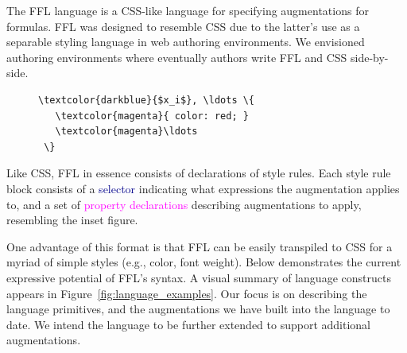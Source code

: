 The FFL language is a CSS-like language for specifying augmentations for formulas. FFL was designed to resemble CSS due to the latter's use as a separable styling language in web authoring environments. We envisioned authoring environments where eventually authors write FFL and CSS side-by-side.

\begin{figure}
\vspace{-2ex} %
\begin{Verbatim}[commandchars=\\\{\}]
 \textcolor{darkblue}{$x_i$}, \ldots \{
   \textcolor{magenta}{ color: red; }
   \textcolor{magenta}\ldots
 \}
\end{Verbatim}
\end{figure}
Like CSS, FFL in essence consists of declarations of style rules. Each style rule block consists of a \textcolor{darkblue}{selector} indicating what expressions the augmentation applies to, and a set of \textcolor{magenta}{property declarations} describing augmentations to apply, resembling the inset figure.


One advantage of this format is that FFL can be easily transpiled to CSS for a myriad of simple styles (e.g., color, font weight). Below demonstrates the current expressive potential of FFL's syntax. A visual summary of language constructs appears in Figure~\ref{fig:language_examples}. Our focus is on describing the language primitives, and the augmentations we have built into the language to date. We intend the language to be further extended to support additional augmentations.


